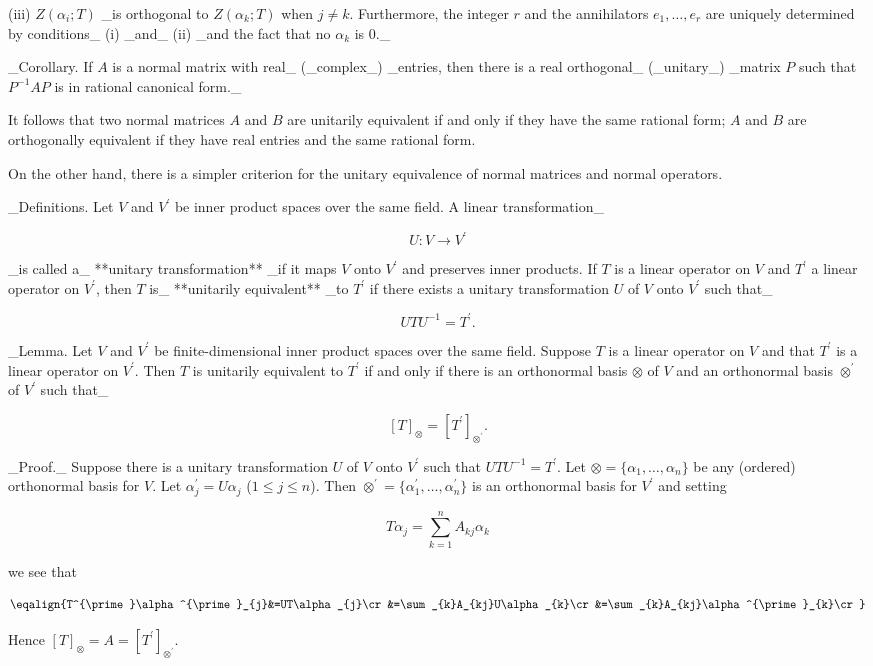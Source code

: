 (iii) \(Z(\alpha_{i};T)\) _is orthogonal to \(Z(\alpha_{k};T)\) when \(j\neq k\). Furthermore, the integer \(r\) and the annihilators \(e_{1},\ldots,e_{r}\) are uniquely determined by conditions_ (i) _and_ (ii) _and the fact that no \(\alpha_{k}\) is \(0\)._

_Corollary. If \(A\) is a normal matrix with real_ (_complex_) _entries, then there is a real orthogonal_ (_unitary_) _matrix \(P\) such that \(P^{-1}AP\) is in rational canonical form._

It follows that two normal matrices \(A\) and \(B\) are unitarily equivalent if and only if they have the same rational form; \(A\) and \(B\) are orthogonally equivalent if they have real entries and the same rational form.

On the other hand, there is a simpler criterion for the unitary equivalence of normal matrices and normal operators.

_Definitions. Let \(V\) and \(V^{\prime}\) be inner product spaces over the same field. A linear transformation_

\[U\colon V\to V^{\prime}\]

_is called a_ **unitary transformation** _if it maps \(V\) onto \(V^{\prime}\) and preserves inner products. If \(T\) is a linear operator on \(V\) and \(T^{\prime}\) a linear operator on \(V^{\prime}\), then \(T\) is_ **unitarily equivalent** _to \(T^{\prime}\) if there exists a unitary transformation \(U\) of \(V\) onto \(V^{\prime}\) such that_

\[UTU^{-1}=T^{\prime}.\]

_Lemma. Let \(V\) and \(V^{\prime}\) be finite-dimensional inner product spaces over the same field. Suppose \(T\) is a linear operator on \(V\) and that \(T^{\prime}\) is a linear operator on \(V^{\prime}\). Then \(T\) is unitarily equivalent to \(T^{\prime}\) if and only if there is an orthonormal basis \(\otimes\) of \(V\) and an orthonormal basis \(\otimes^{\prime}\) of \(V^{\prime}\) such that_

\[[T]_{\otimes}=[T^{\prime}]_{\otimes^{\prime}}.\]

_Proof._ Suppose there is a unitary transformation \(U\) of \(V\) onto \(V^{\prime}\) such that \(UTU^{-1}=T^{\prime}\). Let \(\otimes=\{\alpha_{1},\ldots,\alpha_{n}\}\) be any (ordered) orthonormal basis for \(V\). Let \(\alpha^{\prime}_{j}=U\alpha_{j}\) (\(1\leq j\leq n\)). Then \(\otimes^{\prime}=\{\alpha^{\prime}_{1},\ldots,\)\(\alpha^{\prime}_{n}\}\) is an orthonormal basis for \(V^{\prime}\) and setting

\[T\alpha_{j}=\sum_{k=1}^{n}A_{kj}\alpha_{k}\]

we see that

\[\eqalign{T^{\prime}\alpha^{\prime}_{j}&=UT\alpha_{j}\cr&=\sum_{k}A_{kj}U\alpha _{k}\cr&=\sum_{k}A_{kj}\alpha^{\prime}_{k}\cr}\]

Hence \([T]_{\otimes}=A=[T^{\prime}]_{\otimes^{\prime}}\).

 